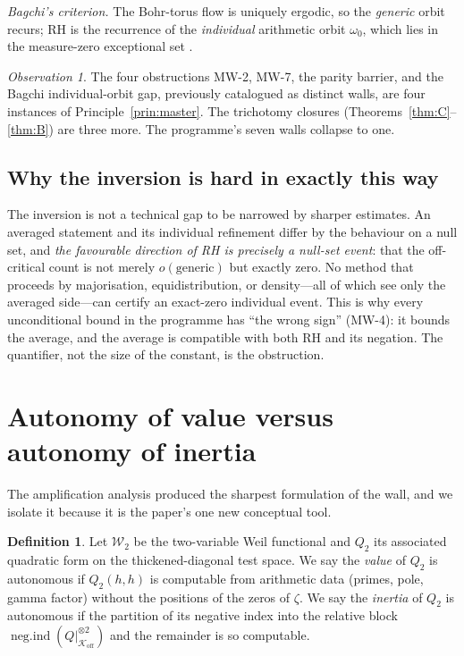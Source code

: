 \documentclass[11pt]{amsart}
\theoremstyle{definition}
\newtheorem{definition}[theorem]{Definition}
\theoremstyle{remark}
\newtheorem{observation}[theorem]{Observation}
\newcommand{\Koff}{\mathcal{K}_{\mathrm{off}}}
\newcommand{\negind}{\operatorname{neg.ind}}
\newcommand{\Wtwo}{\mathcal{W}_2}
\begin{document}
\emph{Bagchi's criterion.} The Bohr-torus flow is uniquely ergodic, so the
\emph{generic} orbit recurs; RH is the recurrence of the \emph{individual}
arithmetic orbit $\omega_0$, which lies in the measure-zero exceptional set
\cite[]{P40}.

\begin{observation}
The four obstructions MW-2, MW-7, the parity barrier, and the Bagchi
individual-orbit gap, previously catalogued as distinct walls, are four
instances of Principle~\ref{prin:master}. The trichotomy closures
(Theorems~\ref{thm:C}--\ref{thm:B}) are three more. The programme's seven
walls collapse to one.
\end{observation}

\subsection{Why the inversion is hard in exactly this way}
The inversion is not a technical gap to be narrowed by sharper estimates. An
averaged statement and its individual refinement differ by the behaviour on a
null set, and \emph{the favourable direction of RH is precisely a null-set
event}: that the off-critical count is not merely $o(\text{generic})$ but
exactly zero. No method that proceeds by majorisation, equidistribution, or
density---all of which see only the averaged side---can certify an exact-zero
individual event. This is why every unconditional bound in the programme has
``the wrong sign'' (MW-4): it bounds the average, and the average is
compatible with both RH and its negation. The quantifier, not the size of
the constant, is the obstruction.

\section{Autonomy of value versus autonomy of inertia}\label{sec:autonomy}

The amplification analysis produced the sharpest formulation of the wall, and
we isolate it because it is the paper's one new conceptual tool.

\begin{definition}
Let $\Wtwo$ be the two-variable Weil functional and $Q_2$ its associated
quadratic form on the thickened-diagonal test space. We say the \emph{value}
of $Q_2$ is autonomous if $Q_2(h,h)$ is computable from arithmetic data
(primes, pole, gamma factor) without the positions of the zeros of $\zeta$.
We say the \emph{inertia} of $Q_2$ is autonomous if the partition of its
negative index into the relative block $\negind(Q|_{\Koff}^{\otimes2})$ and
the remainder is so computable.
\end{definition}
\end{document}
